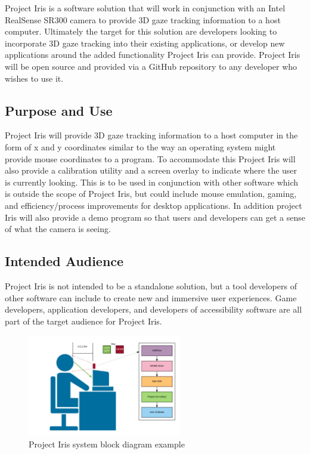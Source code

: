 Project Iris is a software solution that will work in conjunction with an Intel RealSense SR300 camera to provide 3D gaze tracking information to a host computer. Ultimately the target for this solution are developers looking to incorporate 3D gaze tracking into their existing applications, or develop new applications around the added functionality Project Iris can provide. Project Iris will be open source and provided via a GitHub repository to any developer who wishes to use it.

\subsection{Purpose and Use}
Project Iris will provide 3D gaze tracking information to a host computer in the form of x and y coordinates similar to the way an operating system might provide mouse coordinates to a program. To accommodate this Project Iris will also provide a calibration utility and a screen overlay to indicate where the user is currently looking. This is to be used in conjunction with other software which is outside the scope of Project Iris, but could include mouse emulation, gaming, and efficiency/process improvements for desktop applications. In addition project Iris will also provide a demo program so that users and developers can get a sense of what the camera is seeing.

\subsection{Intended Audience}
Project Iris is not intended to be a standalone solution, but a tool developers of other software can include to create new and immersive user experiences. Game developers, application developers, and developers of accessibility software are all part of the target audience for Project Iris.

\begin{figure}[h!]
	\centering
   	\includegraphics[width=0.60\textwidth]{images/project-iris-system-block}
    \caption{Project Iris system block diagram example}
\end{figure}
